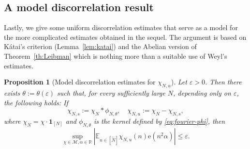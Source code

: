 \documentclass[11pt]{amsart}
\newtheorem{proposition}[lemma]{Proposition}
\theoremstyle{definition}
\begin{document}
\subsection{A model discorrelation result}
Lastly, we give some uniform discorrelation estimates that serve as
a model for the more complicated estimates obtained in the sequel.
The argument is based on
 K\'atai's criterion (Lemma~\ref{lem:katai}) and the Abelian version of Theorem~\ref{th:Leibman} which
  is nothing more than a suitable use of  Weyl's estimates.
\begin{proposition}[Model discorrelation estimates for $\chi_{N,u}$]
Let ${\varepsilon}>0$. Then there exists $\theta:=\theta({\varepsilon})$ such that, for every
 sufficiently large $N$, depending only on  ${\varepsilon}$, the following holds:
If
$$
\chi_{N,s}:=\chi_N*\phi_{N,\theta}, \quad  \chi_{N,u}:=\chi_N-\chi_{N,s},
$$
where $\chi_N=\chi\cdot  {\mathbf{1}}_{[N]}$ and   $\phi_{N,\theta}$ is
the kernel defined by \eqref{eq:fourier-phi},   then
\begin{equation}\label{E:lkj''}
\sup_{\chi\in {{\mathcal M}}, \alpha \in {{\mathbb R}}}|{{\mathbb E}}_{n\in [{{\widetilde N}}]}\chi_{N,u}(n) {\mathrm{e}}(n^2\alpha)|\leq {\varepsilon}.
\end{equation}
\end{proposition}
\end{document}
